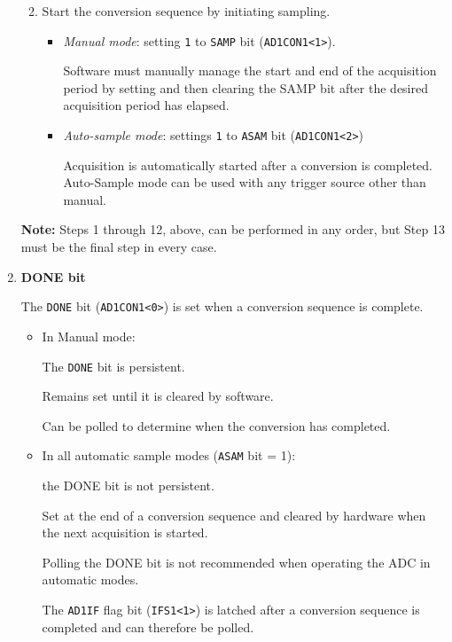 \documentclass[a4paper]{article}
\begin{document}
\begin{enumerate}[label = \arabic*.]
\begin{enumerate}[label = \arabic*.]
\begin{enumerate}[label = \alph*)]
          \end{enumerate}
        \item Start the conversion sequence by initiating sampling.
          \begin{itemize}[leftmargin = 1cm]
            \item \textit{Manual mode}: setting \verb|1| to \verb|SAMP| bit (\verb|AD1CON1<1>|).
              \par Software must manually manage the start and end of the acquisition period by setting and then clearing the SAMP bit after the desired acquisition period has elapsed.
            \item \textit{Auto-sample mode}: settings \verb|1| to \verb|ASAM| bit (\verb|AD1CON1<2>|)
              \par Acquisition is automatically started after a conversion is completed. Auto-Sample mode can be used with any trigger source other than manual.
          \end{itemize}
      \end{enumerate}
      \par \textbf{Note:} Steps 1 through 12, above, can be performed in any order, but Step 13 must be the final step in every case.

    \item \textbf{DONE bit}

      \par The \verb|DONE| bit (\verb|AD1CON1<0>|) is set when a conversion sequence is complete.
      \begin{itemize}[leftmargin = 1cm]
        \item In Manual mode:
          \par The \verb|DONE| bit is persistent.
          \par Remains set until it is cleared by software.
          \par Can be polled to determine when the conversion has completed.
        \item In all automatic sample modes (\verb|ASAM| bit = 1):
          \par the DONE bit is not persistent.
          \par Set at the end of a conversion sequence and cleared by hardware when the next acquisition is started.
          \par Polling the DONE bit is not recommended when operating the ADC in automatic modes.
          \par The \verb|AD1IF| flag bit (\verb|IFS1<1>|) is latched after a conversion sequence is completed and can therefore be polled.
      \end{itemize}



  \end{enumerate}
\end{document}
